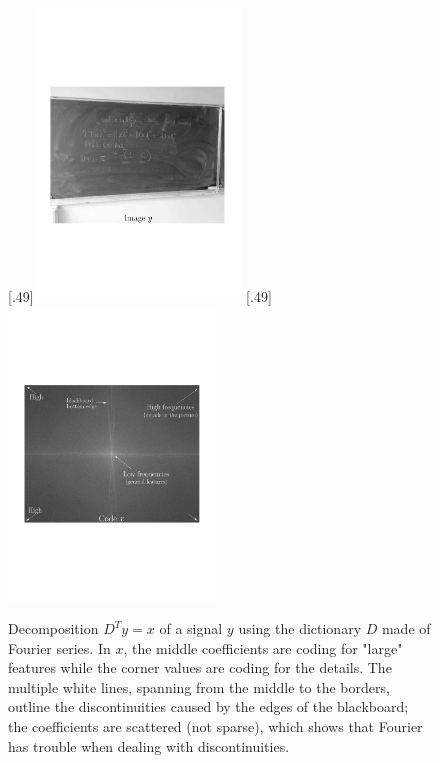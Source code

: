 \begin{figure}[!ht]
%
  [.49\linewidth]{\includegraphics[width=0.49\textwidth]{figures/exple_fourier_spacial.pdf}}
  [.49\linewidth]{\includegraphics[width=0.49\textwidth]{figures/exple_fourier_frequen.pdf}}
  \caption{Decomposition $D^Ty=x$ of a signal $y$ using the dictionary $D$ made of Fourier series. In $x$, the middle coefficients are coding for "large" features while the corner values are coding for the details. The multiple white lines, spanning from the middle to the borders, outline the discontinuities caused by the edges of the blackboard; the coefficients are scattered (not sparse), which shows that Fourier has trouble when dealing with discontinuities.} \label{fig_fourier}
\end{figure}

